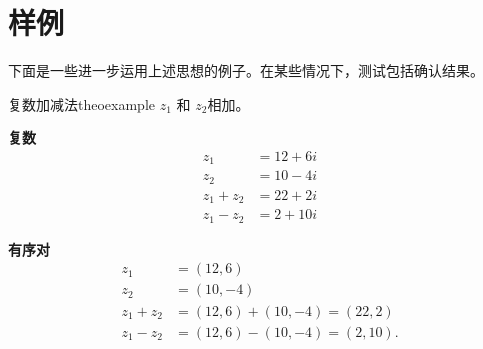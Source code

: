 \section{样例}
下面是一些进一步运用上述思想的例子。在某些情况下，测试包括确认结果。

\begin{myexample}{复数加减法}{theoexample}
$z_{1}$ 和 $z_{2}$相加。

\textbf{复数}
$$
  \begin{aligned}
    z_{1}       & =12+6 i \\
    z_{2}       & =10-4 i \\
    z_{1}+z_{2} & =22+2 i \\
    z_{1}-z_{2} & =2+10 i
  \end{aligned}
$$

\textbf{有序对}
$$
  \begin{aligned}
    z_{1}       & =(12,6)                  \\
    z_{2}       & =(10,-4)                 \\
    z_{1}+z_{2} & =(12,6)+(10,-4)=(22,2)   \\
    z_{1}-z_{2} & =(12,6)-(10,-4)=(2,10) .
  \end{aligned}
$$


\end{myexample}
